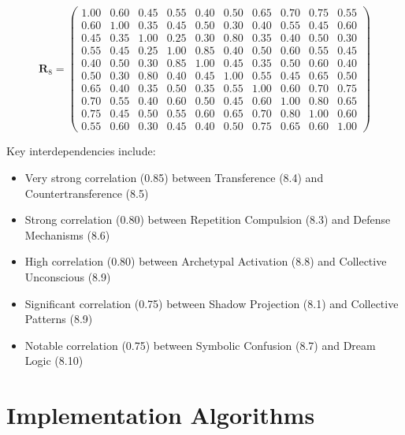 \documentclass[11pt,a4paper]{article}
\begin{document}
\begin{equation}
\mathbf{R}_8 = \begin{pmatrix}
1.00 & 0.60 & 0.45 & 0.55 & 0.40 & 0.50 & 0.65 & 0.70 & 0.75 & 0.55 \\
0.60 & 1.00 & 0.35 & 0.45 & 0.50 & 0.30 & 0.40 & 0.55 & 0.45 & 0.60 \\
0.45 & 0.35 & 1.00 & 0.25 & 0.30 & 0.80 & 0.35 & 0.40 & 0.50 & 0.30 \\
0.55 & 0.45 & 0.25 & 1.00 & 0.85 & 0.40 & 0.50 & 0.60 & 0.55 & 0.45 \\
0.40 & 0.50 & 0.30 & 0.85 & 1.00 & 0.45 & 0.35 & 0.50 & 0.60 & 0.40 \\
0.50 & 0.30 & 0.80 & 0.40 & 0.45 & 1.00 & 0.55 & 0.45 & 0.65 & 0.50 \\
0.65 & 0.40 & 0.35 & 0.50 & 0.35 & 0.55 & 1.00 & 0.60 & 0.70 & 0.75 \\
0.70 & 0.55 & 0.40 & 0.60 & 0.50 & 0.45 & 0.60 & 1.00 & 0.80 & 0.65 \\
0.75 & 0.45 & 0.50 & 0.55 & 0.60 & 0.65 & 0.70 & 0.80 & 1.00 & 0.60 \\
0.55 & 0.60 & 0.30 & 0.45 & 0.40 & 0.50 & 0.75 & 0.65 & 0.60 & 1.00
\end{pmatrix}
\end{equation}

Key interdependencies include:
\begin{itemize}
\item Very strong correlation (0.85) between Transference (8.4) and Countertransference (8.5)
\item Strong correlation (0.80) between Repetition Compulsion (8.3) and Defense Mechanisms (8.6)
\item High correlation (0.80) between Archetypal Activation (8.8) and Collective Unconscious (8.9)
\item Significant correlation (0.75) between Shadow Projection (8.1) and Collective Patterns (8.9)
\item Notable correlation (0.75) between Symbolic Confusion (8.7) and Dream Logic (8.10)
\end{itemize}

\section{Implementation Algorithms}
\end{document}
